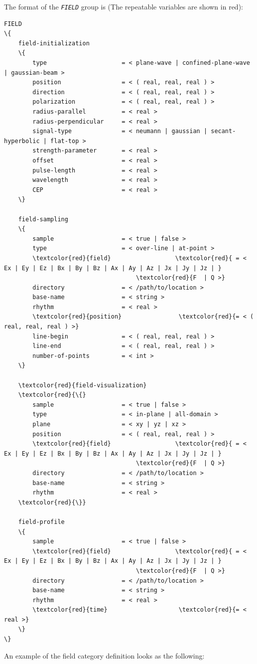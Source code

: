 The format of the {\tt \small \em FIELD} group is (The repeatable variables are shown in red):
%
\begin{Verbatim}[frame=single, fontsize=\small, tabsize=4, fontfamily=courier, fontseries=b, commandchars=\\\{\}, obeytabs]
FIELD
\{
	field-initialization
	\{
		type  					 = < plane-wave | confined-plane-wave | gaussian-beam >
		position  				 = < ( real, real, real ) >
		direction  				 = < ( real, real, real ) >
		polarization  			 = < ( real, real, real ) >
		radius-parallel  		 = < real >
		radius-perpendicular  	 = < real >
		signal-type  			 = < neumann | gaussian | secant-hyperbolic | flat-top >
		strength-parameter  	 = < real >
		offset  				 = < real >
		pulse-length  			 = < real >
		wavelength  			 = < real >
		CEP  					 = < real >
	\}

	field-sampling
	\{
		sample  				 = < true | false >
		type  					 = < over-line | at-point >
		\textcolor{red}{field} 					\textcolor{red}{ = < Ex | Ey | Ez | Bx | By | Bz | Ax | Ay | Az | Jx | Jy | Jz | }
									 \textcolor{red}{F  | Q >}
		directory  				 = < /path/to/location >
		base-name  				 = < string >
		rhythm  				 = < real >
		\textcolor{red}{position}  				 \textcolor{red}{= < ( real, real, real ) >}
		line-begin  			 = < ( real, real, real ) >
		line-end  				 = < ( real, real, real ) >
		number-of-points  		 = < int >
	\}

	\textcolor{red}{field-visualization}
	\textcolor{red}{\{}
		sample  				 = < true | false >
		type					 = < in-plane | all-domain >
		plane					 = < xy | yz | xz >
		position  				 = < ( real, real, real ) >
		\textcolor{red}{field} 					\textcolor{red}{ = < Ex | Ey | Ez | Bx | By | Bz | Ax | Ay | Az | Jx | Jy | Jz | }
									 \textcolor{red}{F  | Q >}
		directory  				 = < /path/to/location >
		base-name  				 = < string >
		rhythm  				 = < real >
	\textcolor{red}{\}}

	field-profile
	\{
		sample  				 = < true | false >
		\textcolor{red}{field} 					\textcolor{red}{ = < Ex | Ey | Ez | Bx | By | Bz | Ax | Ay | Az | Jx | Jy | Jz | }
									 \textcolor{red}{F  | Q >}
		directory  				 = < /path/to/location >
		base-name  				 = < string >
		rhythm  				 = < real >
		\textcolor{red}{time}  					 \textcolor{red}{= < real >}
	\}
\}
\end{Verbatim}
%
An example of the field category definition looks as the following:
%
